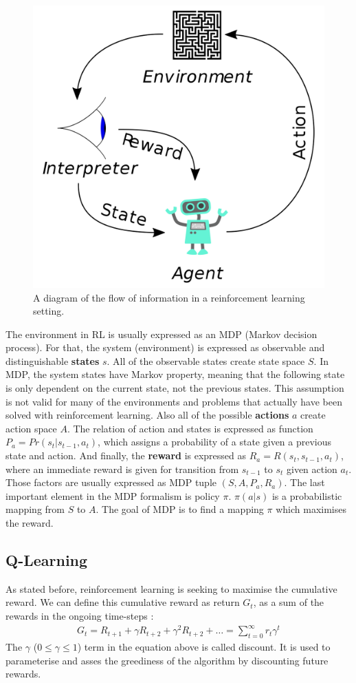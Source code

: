 \begin{figure}
  \centering
  \includegraphics[width=0.4\linewidth]{figures/chapter3/Reinforcement_learning_diagram.svg.png}
  \caption[rlenv]{A diagram of the flow of information in a reinforcement learning setting\footnotemark.}
  \label{fig:rl_env_flow}
\end{figure}

The environment in RL is usually expressed as an MDP (Markov decision process).
For that, the system (environment) is expressed as observable and distinguishable \textbf{states} $s$.
All of the observable states create state space $S$.
In MDP, the system states have Markov property, meaning that the following state is only dependent on the current state, not the previous states.
This assumption is not valid for many of the environments and problems that actually have been solved with reinforcement learning.
Also all of the possible \textbf{actions}  $a$ create action space $A$.
The relation of action and states is expressed as function $P_{a}=Pr(s_{t} | s_{t-1}, a_{t})$, which assigns a probability of a state given a previous state and action.
And finally, the \textbf{reward} is expressed as $R_{a}=R(s_{t}, s_{t-1}, a_{t})$, where an immediate reward is given for transition from $s_{t-1}$ to $s_{t}$ given action $a_{t}$.
Those factors are usually expressed as MDP tuple $(S, A, P_{a}, R_{a})$.
The last important element in the MDP formalism is policy $\pi$.
$\pi(a|s)$ is a probabilistic mapping from $S$ to $A$. The goal of MDP is to find a mapping $\pi$ which maximises the reward.

\subsection{Q-Learning}

As stated before, reinforcement learning is seeking to maximise the cumulative reward.
We can define this cumulative reward as return $G_{t}$, as a sum of the rewards in the ongoing time-steps \cite{Sutton1998}:
\begin{align}
  G_{t} = R_{t+1} +  \gamma R_{t+2} + \gamma^{2} R_{t+2} + \ldots =   \sum_{t=0}^{\infty} r_{t}\gamma^{t}
\end{align}
The $\gamma$ ($0 \leq \gamma \leq 1$) term in the equation above is called discount.
It is used to parameterise and asses the greediness of the algorithm by discounting future rewards.

